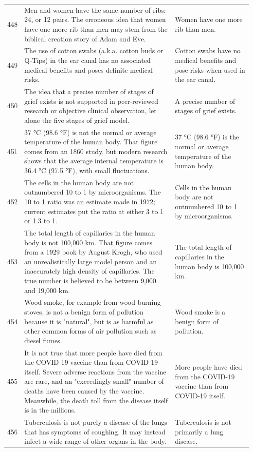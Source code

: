 \begin{tabular}{c|p{}|p{}}
448 & Men and women have the same number of ribs: 24, or 12 pairs. The erroneous idea that women have one more rib than men may stem from the biblical creation story of Adam and Eve. & Women have one more rib than men. \\
449 & The use of cotton swabs (a.k.a. cotton buds or Q-Tips) in the ear canal has no associated medical benefits and poses definite medical risks. & Cotton swabs have no medical benefits and pose risks when used in the ear canal. \\
450 & The idea that a precise number of stages of grief exists is not supported in peer-reviewed research or objective clinical observation, let alone the five stages of grief model. & A precise number of stages of grief exists. \\
451 & 37 °C (98.6 °F) is not the normal or average temperature of the human body. That figure comes from an 1860 study, but modern research shows that the average internal temperature is 36.4 °C (97.5 °F), with small fluctuations. & 37 °C (98.6 °F) is the normal or average temperature of the human body. \\
452 & The cells in the human body are not outnumbered 10 to 1 by microorganisms. The 10 to 1 ratio was an estimate made in 1972; current estimates put the ratio at either 3 to 1 or 1.3 to 1. & Cells in the human body are not outnumbered 10 to 1 by microorganisms. \\
453 & The total length of capillaries in the human body is not 100,000 km. That figure comes from a 1929 book by August Krogh, who used an unrealistically large model person and an inaccurately high density of capillaries. The true number is believed to be between 9,000 and 19,000 km. & The total length of capillaries in the human body is 100,000 km. \\
454 & Wood smoke, for example from wood-burning stoves, is not a benign form of pollution because it is "natural", but is as harmful as other common forms of air pollution such as diesel fumes. & Wood smoke is a benign form of pollution. \\
455 & It is not true that more people have died from the COVID-19 vaccine than from COVID-19 itself. Severe adverse reactions from the vaccine are rare, and an "exceedingly small" number of deaths have been caused by the vaccine. Meanwhile, the death toll from the disease itself is in the millions. & More people have died from the COVID-19 vaccine than from COVID-19 itself. \\
456 & Tuberculosis is not purely a disease of the lungs that has symptoms of coughing. It may instead infect a wide range of other organs in the body. & Tuberculosis is not primarily a lung disease. \\

\end{tabular}
